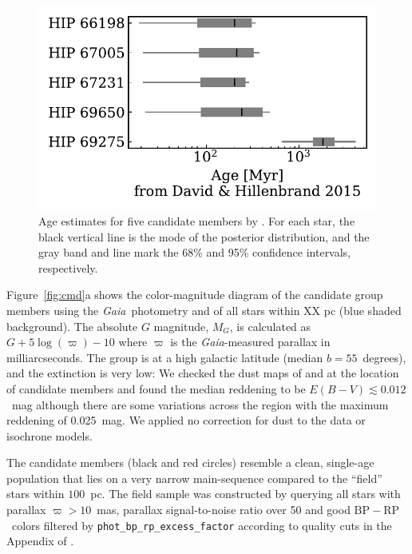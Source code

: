\documentclass[modern,letterpaper]{aastex61}
\newcommand{\project}[1]{\textsl{#1}}
\newcommand{\gaia}{\project{Gaia}}
\newcommand{\todo}[1]{{\color{crimson}#1}}
\newcommand{\bprp}{\ensuremath{\mathrm{BP}-\mathrm{RP}}}
\begin{document}
\begin{figure}
  \centering
  \includegraphics{age_DavidHillenbrand2015.pdf}
  \caption{Age estimates for five candidate members by \citet{2015ApJ...804..146D}.
    For each star, the black vertical line is the mode of the posterior
    distribution, and the gray band and line mark the 68\% and 95\% confidence
    intervals, respectively.
  }
  \label{fig:age_DavidHillenbrand2015}
\end{figure}

Figure~\ref{fig:cmd}a shows the color-magnitude diagram of the candidate group
members using the \gaia\ photometry \todo{and of all stars within XX pc (blue shaded background)}.
The absolute $G$ magnitude, $M_G$, is calculated as $G + 5\log(\varpi) - 10$ where $\varpi$ is the \gaia-measured parallax in milliarcseconds.
The group is at a high galactic latitude (median $b=55$~degrees),
and the extinction is very low:
We checked the dust maps of \citet{1998ApJ...500..525S} and
\citet{2017ApJ...846...38L}
at the location of candidate members and found the median reddening to be
$E(B-V)\lesssim 0.012$~mag although there are some variations across the region with
the maximum reddening of 0.025~mag.
We applied no correction for dust to the data or isochrone models.

The candidate members (black and red circles) resemble a clean, single-age population
that lies on a very narrow main-sequence compared to the ``field'' stars within $100$~pc.
The field sample was constructed by querying all stars with parallax $\varpi>10$~mas,
parallax signal-to-noise ratio over 50 and good \bprp\ colors filtered by
\texttt{phot\_bp\_rp\_excess\_factor} according to quality cuts in the Appendix of \citet{2018arXiv180409378G}.
\end{document}
